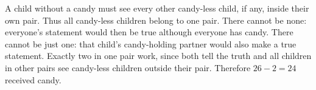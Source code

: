 A child without a candy must see every other candy-less child, if any, inside their own pair. Thus all candy-less children belong to one pair. There cannot be none: everyone's statement would then be true although everyone has candy. There cannot be just one: that child's candy-holding partner would also make a true statement. Exactly two in one pair work, since both tell the truth and all children in other pairs see candy-less children outside their pair. Therefore $26-2=\boxed{24}$ received candy.
